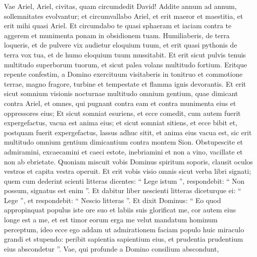 \begin{biblechapter}
\begin{biblechapter}
\begin{biblechapter}
\begin{biblechapter}
\begin{biblechapter}
\begin{biblechapter}
\begin{biblechapter}
\begin{biblechapter}
\begin{biblechapter}
\begin{biblechapter}
\begin{biblechapter}
\begin{biblechapter}
\begin{biblechapter}
\begin{biblechapter}
\begin{biblechapter}
\begin{biblechapter}
\begin{biblechapter}
\begin{biblechapter}
\begin{biblechapter}
\begin{biblechapter}
\begin{biblechapter}
\begin{biblechapter}
\begin{biblechapter}
\begin{biblechapter}
\begin{biblechapter}
\begin{biblechapter}
\begin{biblechapter}
\begin{biblechapter}
\begin{biblechapter}
\verse Vae Ariel, Ariel, civitas,
 quam circumdedit David!
 Addite annum ad annum,
 sollemnitates evolvantur;
 \verse et circumvallabo Ariel,
 et erit maeror et maestitia,
 et erit mihi quasi Ariel.
 \verse Et circumdabo te quasi sphaeram
 et iaciam contra te aggerem
 et munimenta ponam in obsidionem tuam.
 \verse Humiliaberis, de terra loqueris,
 et de pulvere vix audietur eloquium tuum,
 et erit quasi pythonis de terra vox tua,
 et de humo eloquium tuum mussitabit.
 \verse Et erit sicut pulvis tenuis multitudo superborum tuorum,
 et sicut palea volans multitudo fortium.
 Eritque repente confestim,
 \verse a Domino exercituum visitaberis
 in tonitruo et commotione terrae,
 magno fragore, turbine et tempestate
 et flamma ignis devorantis.
 \verse Et erit sicut somnium visionis nocturnae
 multitudo omnium gentium, quae dimicant contra Ariel,
 et omnes, qui pugnant contra eam et contra munimenta eius et oppressores eius;
 \verse Et sicut somniat esuriens, et ecce comedit,
 cum autem fuerit expergefactus, vacua est anima eius;
 et sicut somniat sitiens, et ecce bibit
 et, postquam fuerit expergefactus, lassus adhuc sitit,
 et anima eius vacua est,
 sic erit multitudo omnium gentium
 dimicantium contra montem Sion. 
\verse Obstupescite et admiramini,
 excaecamini et caeci estote,
 inebriamini et non a vino,
 vacillate et non ab ebrietate.
 \verse Quoniam miscuit vobis Dominus spiritum soporis,
 clausit oculos vestros
 et capita vestra operuit.
 \verse Et erit vobis visio omnis sicut verba libri signati; quem cum dederint scienti litteras dicentes: “ Lege istum ”, respondebit: “ Non possum, signatus est enim ”. 
\verse Et dabitur liber nescienti litteras diceturque ei: “ Lege ”, et respondebit: “ Nescio litteras ”.
 \verse Et dixit Dominus:
 “ Eo quod appropinquat populus iste ore suo
 et labiis suis glorificat me,
 cor autem eius longe est a me,
 et est timor eorum erga me
 velut mandatum hominum perceptum,
 \verse ideo ecce ego addam ut admirationem faciam
 populo huic miraculo grandi et stupendo:
 peribit sapientia sapientium eius,
 et prudentia prudentium eius abscondetur ”.
 \verse Vae, qui profunde a Domino
 consilium abscondunt,

\end{biblechapter}
\end{biblechapter}
\end{biblechapter}
\end{biblechapter}
\end{biblechapter}
\end{biblechapter}
\end{biblechapter}
\end{biblechapter}
\end{biblechapter}
\end{biblechapter}
\end{biblechapter}
\end{biblechapter}
\end{biblechapter}
\end{biblechapter}
\end{biblechapter}
\end{biblechapter}
\end{biblechapter}
\end{biblechapter}
\end{biblechapter}
\end{biblechapter}
\end{biblechapter}
\end{biblechapter}
\end{biblechapter}
\end{biblechapter}
\end{biblechapter}
\end{biblechapter}
\end{biblechapter}
\end{biblechapter}
\end{biblechapter}
